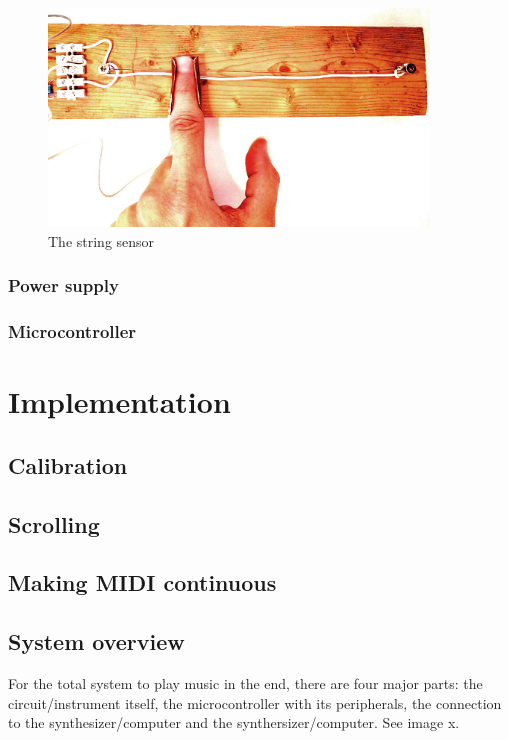 \documentclass{article}
\begin{document}
\begin{figure}[h]
  \centering
  \includegraphics[width=0.9\textwidth]{string-sensor}
  \caption{The string sensor}
  \label{fig:string_sensor}
\end{figure}

\subsubsection{Power supply}

\subsubsection{Microcontroller}

\section{Implementation}

\subsection{Calibration}

\subsection{Scrolling}

\subsection{Making MIDI continuous}

\subsection{System overview}
For the total system to play music in the end, there are four major parts: the circuit/instrument itself, the microcontroller with its peripherals, the connection to the synthesizer/computer and the synthersizer/computer. See image x.
\end{document}
